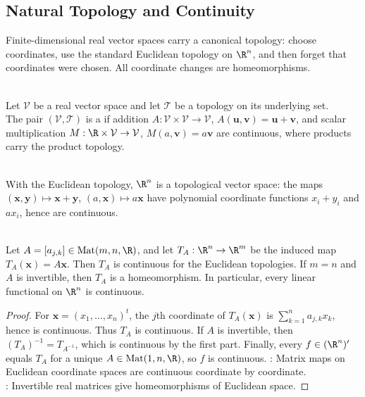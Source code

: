 \subsection{Natural Topology and Continuity}

Finite-dimensional real vector spaces carry a canonical topology: choose coordinates, use the standard Euclidean topology on $\R^n$, and then forget that coordinates were chosen. All coordinate changes are homeomorphisms.

\begin{definition} \label{def:topological-vector-space} \\
Let $\mathcal{V}$ be a real vector space and let $\mathcal{T}$ be a topology on its underlying set.\\
The pair $(\mathcal{V},\mathcal{T})$ is a  if addition $A:\mathcal{V}\times\mathcal{V}\to\mathcal{V}$, $A(\mathbf{u},\mathbf{v})=\mathbf{u}+\mathbf{v}$, and scalar multiplication $M:\R\times\mathcal{V}\to\mathcal{V}$, $M(a,\mathbf{v})=a\mathbf{v}$ are continuous, where products carry the product topology.
\end{definition}

\begin{example} \label{ex:rn-standard-topological-vector-space} \\
With the Euclidean topology, $\R^n$ is a topological vector space: the maps $(\mathbf{x},\mathbf{y})\longmapsto \mathbf{x}+\mathbf{y}$, $(a,\mathbf{x})\longmapsto a\mathbf{x}$ have polynomial coordinate functions $x_i+y_i$ and $ax_i$, hence are continuous.
\end{example}

\begin{proposition} \label{prop:real-matrix-maps-continuous-homeomorphisms} \\
Let $A=[a_{j,k}]\in\operatorname{Mat}(m,n,\R)$, and let $T_A:\R^n\to\R^m$ be the induced map $T_A(\mathbf{x})=A\mathbf{x}$. Then $T_A$ is continuous for the Euclidean topologies. If $m=n$ and $A$ is invertible, then $T_A$ is a homeomorphism. In particular, every linear functional on $\R^n$ is continuous.
\begin{proof}
For $\mathbf{x}=(x_1,\ldots,x_n)^t$, the $j$th coordinate of $T_A(\mathbf{x})$ is $\sum\limits_{k=1}^n a_{j,k}x_k$, hence is continuous. Thus $T_A$ is continuous. If $A$ is invertible, then $(T_A)^{-1}=T_{A^{-1}}$, which is continuous by the first part. Finally, every $f\in(\R^n)'$ equals $T_A$ for a unique $A\in\operatorname{Mat}(1,n,\R)$, so $f$ is continuous.
: Matrix maps on Euclidean coordinate spaces are continuous coordinate by coordinate.\\
: Invertible real matrices give homeomorphisms of Euclidean space.
\end{proof}
\end{proposition}

